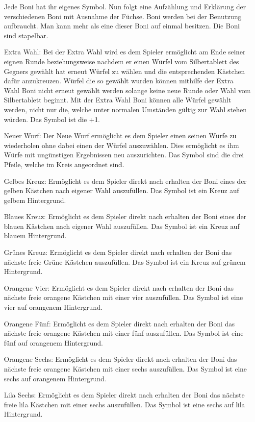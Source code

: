 Jede Boni hat ihr eigenes Symbol. Nun folgt eine Aufzählung und Erklärung der verschiedenen Boni mit Ausnahme der Füchse. Boni werden bei der Benutzung aufbraucht. Man kann mehr als eine dieser Boni auf einmal besitzen. Die Boni sind stapelbar.

Extra Wahl: Bei der Extra Wahl wird es dem Spieler ermöglicht am Ende seiner eignen Runde beziehungsweise nachdem er einen Würfel vom Silbertablett des Gegners gewählt hat erneut Würfel zu wählen und die entsprechenden Kästchen dafür anzukreuzen. Würfel die so gewählt wurden können mithilfe der Extra Wahl Boni nicht erneut gewählt werden solange keine neue Runde oder Wahl vom Silbertablett beginnt. Mit der Extra Wahl Boni können alle Würfel gewählt werden, nicht nur die, welche unter normalen Umständen gültig zur Wahl stehen würden. Das Symbol ist die +1.

Neuer Wurf: Der Neue Wurf ermöglicht es dem Spieler einen seinen Würfe zu wiederholen ohne dabei einen der Würfel auszuwählen. Dies ermöglicht es ihm Würfe mit ungünstigen Ergebnissen neu auszurichten. Das Symbol sind die drei Pfeile, welche im Kreis angeordnet sind.

Gelbes Kreuz: Ermöglicht es dem Spieler direkt nach erhalten der Boni eines der gelben Kästchen nach eigener Wahl auszufüllen. Das Symbol ist ein Kreuz auf gelbem Hintergrund.

Blaues Kreuz: Ermöglicht es dem Spieler direkt nach erhalten der Boni eines der blauen Kästchen nach eigener Wahl auszufüllen. Das Symbol ist ein Kreuz auf blauem Hintergrund.

Grünes Kreuz: Ermöglicht es dem Spieler direkt nach erhalten der Boni das nächste freie Grüne Kästchen auszufüllen. Das Symbol ist ein Kreuz auf grünem Hintergrund.

Orangene Vier: Ermöglicht es dem Spieler direkt nach erhalten der Boni das nächste freie orangene Kästchen mit einer vier auszufüllen. Das Symbol ist eine vier auf orangenem Hintergrund.

Orangene Fünf: Ermöglicht es dem Spieler direkt nach erhalten der Boni das nächste freie orangene Kästchen mit einer fünf auszufüllen. Das Symbol ist eine fünf auf orangenem Hintergrund.

Orangene Sechs: Ermöglicht es dem Spieler direkt nach erhalten der Boni das nächste freie orangene Kästchen mit einer sechs auszufüllen. Das Symbol ist eine sechs auf orangenem Hintergrund.

Lila Sechs: Ermöglicht es dem Spieler direkt nach erhalten der Boni das nächste freie lila Kästchen mit einer sechs auszufüllen. Das Symbol ist eine sechs auf lila Hintergrund. \\

